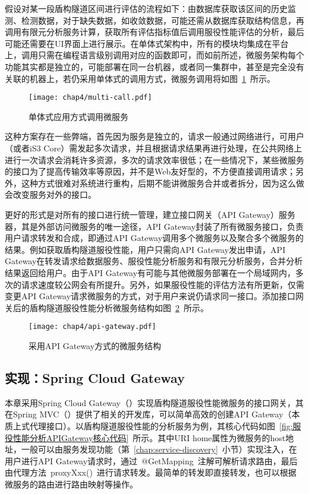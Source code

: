 假设对某一段盾构隧道区间进行评估的流程如下：由数据库获取该区间的历史监测、检测数据，对于缺失数据，如收敛数据，可能还需从数据库获取结构信息，再调用有限元分析服务计算，获取所有评估指标值后调用服役性能评估的分析，最后可能还需要在UI界面上进行展示。在单体式架构中，所有的模块均集成在平台上，调用只需在编程语言级别调用对应的函数即可，而如前所述，微服务架构每个功能其实都是独立的，可能部署在同一台机器，或者同一集群中，甚至是完全没有关联的机器上，若仍采用单体式的调用方式，微服务调用将如图~\ref{fig:单体架构方式调用微服务}~所示。

\begin{figure}[htb!]
    \centering
    \texttt{[image: chap4/multi-call.pdf]}
    \caption{单体式应用方式调用微服务}
    \label{fig:单体架构方式调用微服务}
\end{figure}

这种方案存在一些弊端，首先因为服务是独立的，请求一般通过网络进行，可用户（或者iS3 Core）需发起多次请求，并且根据请求结果再进行处理，在公共网络上进行一次请求会消耗许多资源，多次的请求效率很低；在一些情况下，某些微服务的接口为了提高传输效率等原因，并不是Web友好型的，不方便直接调用请求；另外，这种方式很难对系统进行重构，后期不能讲微服务合并或者拆分，因为这么做会改变服务对外的接口。

更好的形式是对所有的接口进行统一管理，建立接口网关（API Gateway）服务器，其是外部访问微服务的唯一途径，API Gateway封装了所有微服务接口，负责用户请求转发和合成，即通过API Gateway调用多个微服务以及聚合多个微服务的结果。例如获取盾构隧道服役性能，用户只需向API Gateway发出申请，API Gateway在转发请求给数据服务、服役性能分析服务和有限元分析服务，合并分析结果返回给用户。由于API Gateway有可能与其他微服务部署在一个局域网内，多次的请求速度较公网会有所提升。另外，如果服役性能的评估方法有所更新，仅需变更API Gateway请求微服务的方式，对于用户来说仍请求同一接口。添加接口网关后的盾构隧道服役性能分析微服务结构如图~\ref{fig:采用APIGateway方式的微服务结构}~所示。

\begin{figure}[htb!]
    \centering
    \texttt{[image: chap4/api-gateway.pdf]}
    \caption{采用API Gateway方式的微服务结构}
    \label{fig:采用APIGateway方式的微服务结构}
\end{figure}

\subsection{实现：Spring Cloud Gateway}

本章采用Spring Cloud Gateway（\citeyear{springcloudapigateway}）实现盾构隧道服役性能微服务的接口网关，其在Spring MVC（\citeyear{springmvc}）提供了相关的开发库，可以简单高效的创建API Gateway（本质上式代理接口）。以盾构隧道服役性能的分析服务为例，其核心代码如图~\ref{fig:服役性能分析APIGateway核心代码}~所示。其中URI home属性为微服务的host地址，一般可以由服务发现功能（第~\ref{chap:service-discovery}~小节）实现注入，在用户进行API Gateway请求时，通过~@GetMapping~注解可解析请求路由，最后由代理方法~proxyXxx()~进行请求转发。最简单的转发即直接转发，也可以根据微服务的路由进行路由映射等操作。


